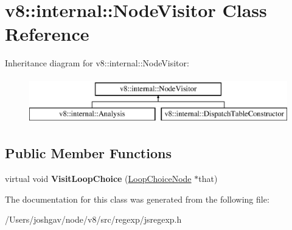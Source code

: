 \hypertarget{classv8_1_1internal_1_1_node_visitor}{}\section{v8\+:\+:internal\+:\+:Node\+Visitor Class Reference}
\label{classv8_1_1internal_1_1_node_visitor}
Inheritance diagram for v8\+:\+:internal\+:\+:Node\+Visitor\+:\begin{figure}[H]
\begin{center}
\leavevmode
\includegraphics[height=2.000000cm]{classv8_1_1internal_1_1_node_visitor}
\end{center}
\end{figure}
\subsection*{Public Member Functions}
\begin{DoxyCompactItemize}
\item 
virtual void {\bfseries Visit\+Loop\+Choice} (\hyperlink{classv8_1_1internal_1_1_loop_choice_node}{Loop\+Choice\+Node} $\ast$that)\hypertarget{classv8_1_1internal_1_1_node_visitor_a0181d645b844eb3fdbfe3defa7277aed}{}\label{classv8_1_1internal_1_1_node_visitor_a0181d645b844eb3fdbfe3defa7277aed}

\end{DoxyCompactItemize}


The documentation for this class was generated from the following file\+:\begin{DoxyCompactItemize}
\item 
/\+Users/joshgav/node/v8/src/regexp/jsregexp.\+h\end{DoxyCompactItemize}
